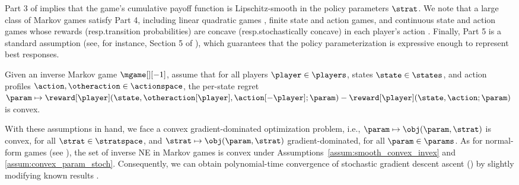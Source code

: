 
%
Part 3 of  implies that the game's cumulative payoff function is Lipschitz-smooth in the policy parameters $\strat$.
We note that a large class of Markov games satisfy Part 4, including 
linear quadratic games \citep{bhandari2019global}, 
finite state and action games, and continuous state and action games whose rewards (resp.\@ transition probabilities) are concave (resp.\@ stochastically concave) in each player's action \citep{atakan2003valfunc}. 
Finally, Part 5 is a standard assumption (see, for instance, Section 5 of \citet{bhandari2019global}), which guarantees that the policy parameterization is expressive enough to represent best responses.

\begin{assumption}
\label{assum:convex_param_stoch}
    Given an inverse Markov game $\mgame[][-1]$, assume that for all players $\player \in \players$, states $\state \in \states$, and action profiles $\action, \otheraction \in \actionspace$, the per-state regret $\param \mapsto \reward[\player](\state, \otheraction[\player], \action[-\player]; \param) - \reward[\player](\state, \action; \param)$ is convex.
\end{assumption}

With these assumptions in hand, we face a convex gradient-dominated optimization problem, i.e., $\param \mapsto \obj (\param, \strat)$ is convex, for all $\strat \in \stratspace$, and $\strat \mapsto \obj (\param, \strat)$ gradient-dominated, for all $\param \in \params$. 
As for normal-form games (see ), the set of inverse NE in Markov games is convex under Assumptions~\ref{assum:smooth_convex_invex} and \ref{assum:convex_param_stoch}.
Consequently, we can obtain polynomial-time convergence of stochastic gradient descent ascent () by slightly modifying known results \citep{daskalakis2020independent}.


